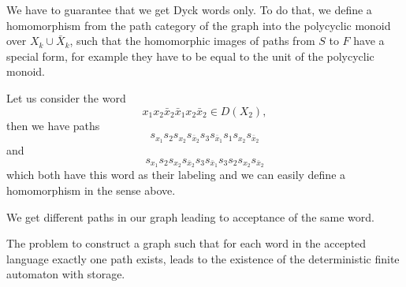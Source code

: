 We have to guarantee that we get Dyck words only. To do that, we define a
homomorphism from the path category of the graph into the polycyclic monoid over
$X_k \cup \bar{X}_k$, such that the homomorphic images of paths from $S$ to
$F$ have a special form, for example they have to be equal to the unit of the
polycyclic monoid.

Let us consider the word
\[ x_1 x_2 \bar{x}_2 \bar{x}_1 x_2 \bar{x}_2 \in D(X_2), \]
then we have paths
\[s_{x_1} s_2 s_{x_2} s_{\bar{x}_2} s_3 s_{\bar{x}_1} s_1
s_{x_2} s_{\bar{x}_2} \] 
and 
\[s_{x_1} s_2 s_{x_2} s_{\bar{x}_2} s_3
s_{\bar{x}_1} s_3 s_2 s_{x_2} s_{\bar{x}_2}\]
which both have this word as their labeling and we can easily define a
homomorphism in the sense above.

We get different paths in our graph leading to acceptance of the same word.

The problem to construct a graph such that for each word in the accepted
language exactly one path exists, leads to the existence of the deterministic
finite automaton with storage.
